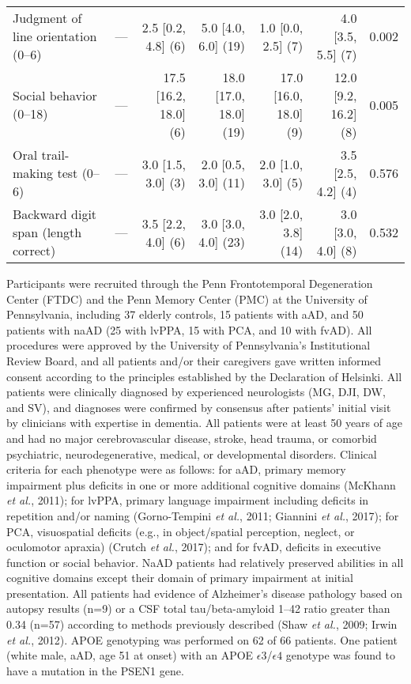 \documentclass[]{article}
\begin{document}
\begin{table}[ht]
{\begin{tabular}{lrrrrrr}
  Judgment of line orientation (0--6) & --- &  2.5 [0.2, 4.8] (6) &  5.0 [4.0, 6.0] (19) &  1.0 [0.0, 2.5] (7) &  4.0 [3.5, 5.5] (7) &  0.002 \\ 
  Social behavior (0--18) & --- & 17.5 [16.2, 18.0] (6) & 18.0 [17.0, 18.0] (19) & 17.0 [16.0, 18.0] (9) & 12.0 [9.2, 16.2] (8) &  0.005 \\ 
  Oral trail-making test (0--6) & --- &  3.0 [1.5, 3.0] (3) &  2.0 [0.5, 3.0] (11) &  2.0 [1.0, 3.0] (5) &  3.5 [2.5, 4.2] (4) &  0.576 \\ 
  Backward digit span (length correct) & --- &  3.5 [2.2, 4.0] (6) &  3.0 [3.0, 4.0] (23) &  3.0 [2.0, 3.8] (14) &  3.0 [3.0, 4.0] (8) &  0.532 \\ 
   \hline
\end{tabular}
}
\end{table}

Participants were recruited through the Penn Frontotemporal Degeneration
Center (FTDC) and the Penn Memory Center (PMC) at the University of
Pennsylvania, including 37 elderly controls, 15 patients with aAD, and
50 patients with naAD (25 with lvPPA, 15 with PCA, and 10 with fvAD).
All procedures were approved by the University of Pennsylvania's
Institutional Review Board, and all patients and/or their caregivers
gave written informed consent according to the principles established by
the Declaration of Helsinki. All patients were clinically diagnosed by
experienced neurologists (MG, DJI, DW, and SV), and diagnoses were
confirmed by consensus after patients' initial visit by clinicians with
expertise in dementia. All patients were at least 50 years of age and
had no major cerebrovascular disease, stroke, head trauma, or comorbid
psychiatric, neurodegenerative, medical, or developmental disorders.
Clinical criteria for each phenotype were as follows: for aAD, primary
memory impairment plus deficits in one or more additional cognitive
domains (McKhann \emph{et al.}, 2011); for lvPPA, primary language
impairment including deficits in repetition and/or naming (Gorno-Tempini
\emph{et al.}, 2011; Giannini \emph{et al.}, 2017); for PCA,
visuospatial deficits (e.g., in object/spatial perception, neglect, or
oculomotor apraxia) (Crutch \emph{et al.}, 2017); and for fvAD, deficits
in executive function or social behavior. NaAD patients had relatively
preserved abilities in all cognitive domains except their domain of
primary impairment at initial presentation. All patients had evidence of
Alzheimer's disease pathology based on autopsy results (n=9) or a CSF
total tau/beta-amyloid 1--42 ratio greater than 0.34 (n=57) according to
methods previously described (Shaw \emph{et al.}, 2009; Irwin \emph{et
al.}, 2012). APOE genotyping was performed on 62 of 66 patients. One
patient (white male, aAD, age 51 at onset) with an APOE
\(\epsilon3\)/\(\epsilon4\) genotype was found to have a mutation in the
PSEN1 gene.
\end{document}
